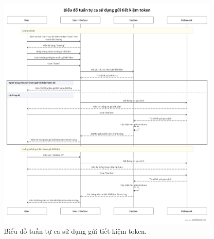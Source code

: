 \begin{figure}[H]
    \centering
    \includegraphics[width=1\textwidth]{figures/c2/StakingSeq.png}
    \caption{Biểu đồ tuần tự ca sử dụng gửi tiết kiệm token.}
    \label{fig:architecture-diagram}
\end{figure}

